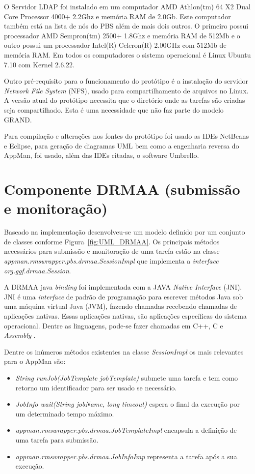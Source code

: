 O Servidor LDAP foi instalado em um computador AMD Athlon(tm) 64 X2 Dual Core Processor 4000+ 2.2Ghz e memória RAM de 2.0Gb. Este computador também está na lista de nós do PBS além de mais dois outros. O primeiro possui processador AMD Sempron(tm) 2500+ 1.8Ghz e memória RAM de 512Mb e o outro possui um processador Intel(R) Celeron(R) 2.00GHz com 512Mb de memória RAM. Em todos os computadores o sistema operacional é Linux Ubuntu 7.10 com Kernel 2.6.22.

Outro pré-requisito para o funcionamento do protótipo é a instalação do servidor \emph{Network File System} (NFS), usado para compartilhamento de arquivos no Linux. A versão atual do protótipo necessita que o diretório onde as tarefas são criadas seja compartilhado. Esta é uma necessidade que não faz parte do modelo GRAND.

Para compilação e alterações nos fontes do protótipo foi usado as IDEs NetBeans\cite{netbeans} e Eclipse\cite{eclipse}, para geração de diagramas UML bem como a engenharia reversa do AppMan, foi usado, além das IDEs citadas, o software Umbrello\cite{umbrello}.

\section{Componente DRMAA (submissão e monitoração)}

Baseado na implementação desenvolveu-se um modelo definido por um conjunto de classes conforme Figura~\ref{fig:UML_DRMAA}. Os principais métodos necessários para submissão e monitoração de uma tarefa estão na classe \emph{appman.rmswrapper.pbs.drmaa.SessionImpl} que implementa a \emph{interface} \emph{org.ggf.drmaa.Session}.

A DRMAA java \emph{binding} foi implementada com a JAVA \emph{Native Interface} (JNI). JNI é uma \emph{interface} de padrão de programação para escrever métodos Java sob uma máquina virtual Java (JVM), fazendo chamadas recebendo chamadas de aplicações nativas. Essas aplicações nativas, são aplicações específicas do sistema operacional. Dentre as linguagens, pode-se fazer chamadas em C++, C e \emph{Assembly} \cite{jni}.

Dentre os inúmeros métodos existentes na classe \emph{SessionImpl} os mais relevantes para o AppMan são:

\begin{itemize}
	\item \emph{String runJob(JobTemplate jobTemplate)} submete uma tarefa e tem como retorno um identificador para ser usado se necessário.
	\item \emph{JobInfo wait(String jobName, long timeout)} espera o final da execução por um determinado tempo máximo.
	\item \emph{appman.rmswrapper.pbs.drmaa.JobTemplateImpl} encapsula a definição de uma tarefa para submissão.
	\item \emph{appman.rmswrapper.pbs.drmaa.JobInfoImp} representa a tarefa após a sua execução.
\end{itemize}


